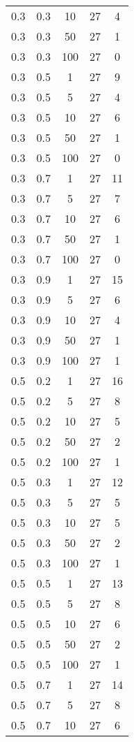 \begin{appendices}
\begin{longtable}{|c|c|c|c|c|}
		0.3 & 0.3 & 10  & 27 & 4  \\
		0.3 & 0.3 & 50  & 27 & 1  \\
		0.3 & 0.3 & 100 & 27 & 0  \\ \hline
		0.3 & 0.5 & 1   & 27 & 9  \\
		0.3 & 0.5 & 5   & 27 & 4  \\
		0.3 & 0.5 & 10  & 27 & 6  \\
		0.3 & 0.5 & 50  & 27 & 1  \\
		0.3 & 0.5 & 100 & 27 & 0  \\ \hline
		0.3 & 0.7 & 1   & 27 & 11 \\
		0.3 & 0.7 & 5   & 27 & 7  \\
		0.3 & 0.7 & 10  & 27 & 6  \\
		0.3 & 0.7 & 50  & 27 & 1  \\
		0.3 & 0.7 & 100 & 27 & 0  \\ \hline
		0.3 & 0.9 & 1   & 27 & 15 \\
		0.3 & 0.9 & 5   & 27 & 6  \\
		0.3 & 0.9 & 10  & 27 & 4  \\
		0.3 & 0.9 & 50  & 27 & 1  \\
		0.3 & 0.9 & 100 & 27 & 1  \\ \hline
		0.5 & 0.2 & 1   & 27 & 16 \\
		0.5 & 0.2 & 5   & 27 & 8  \\
		0.5 & 0.2 & 10  & 27 & 5  \\
		0.5 & 0.2 & 50  & 27 & 2  \\
		0.5 & 0.2 & 100 & 27 & 1  \\ \hline
		0.5 & 0.3 & 1   & 27 & 12 \\
		0.5 & 0.3 & 5   & 27 & 5  \\
		0.5 & 0.3 & 10  & 27 & 5  \\
		0.5 & 0.3 & 50  & 27 & 2  \\
		0.5 & 0.3 & 100 & 27 & 1  \\ \hline
		0.5 & 0.5 & 1   & 27 & 13 \\
		0.5 & 0.5 & 5   & 27 & 8  \\
		0.5 & 0.5 & 10  & 27 & 6  \\
		0.5 & 0.5 & 50  & 27 & 2  \\
		0.5 & 0.5 & 100 & 27 & 1  \\ \hline
		0.5 & 0.7 & 1   & 27 & 14 \\
		0.5 & 0.7 & 5   & 27 & 8  \\
		0.5 & 0.7 & 10  & 27 & 6  \\

\end{longtable}
\end{appendices}
